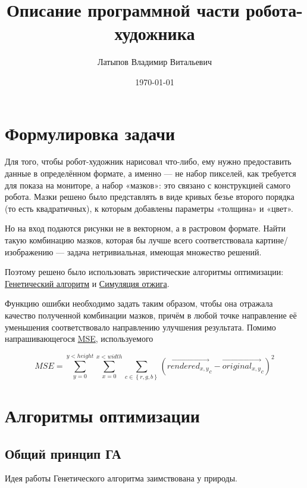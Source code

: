 \documentclass[11pt]{article}
\title{Описание программной части робота-художника}
\author{Латыпов Владимир Витальевич}
\date{\today}
\begin{document}
    \maketitle
    \newpage


    \section{Формулировка задачи}

    Для того, чтобы робот-художник нарисовал что-либо, ему нужно предоставить данные в определённом формате, а именно — не набор пикселей,
    как требуется для показа на мониторе, а набор «мазков»: это связано с конструкцией самого робота.
    Мазки решено было представлять в виде кривых безье второго порядка (то есть квадратичных), к которым добавлены параметры «толщина» и «цвет».

    Но на вход подаются рисунки не в векторном, а в растровом формате.
    Найти такую комбинацию мазков, которая бы лучше всего соответствовала картине/изображению — задача нетривиальная, имеющая множество решений.

    Поэтому решено было использовать эвристические алгоритмы оптимизации:
    \href{https://en.wikipedia.org/wiki/Simulated_annealing}{Генетический алгоритм} и \href{https://en.wikipedia.org/wiki/Simulated_annealing}{Симуляция отжига}.

    Функцию ошибки необходимо задать таким образом, чтобы она отражала качество полученной комбинации мазков,
    причём в любой точке направление её уменьшения соответствовало направлению улучшения результата.
    Помимо напрашивающегося \href{https://en.wikipedia.org/wiki/Mean_squared_error}{MSE}, используемого

    \begin{equation}\label{eq:equation}
        MSE = \sum_{y = 0}^{y < height} { \sum_{x = 0}^{x < width} { \sum_{c \in  \left\{ r, g, b \right\} } { \left( {\overrightarrow {rendered_{x, y}}}_c - {\overrightarrow{original_{x, y}}}_c\right)^2 }}}
    \end{equation}


    \section {Алгоритмы оптимизации}\label{sec:opimization_algorithms}

    \subsection{Общий принцип ГА}\label{subsec:ga_general_principles}
    Идея работы Генетического алгоритма заимствована у природы.
\end{document}

